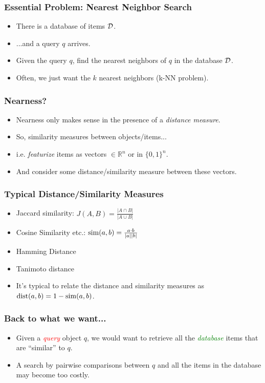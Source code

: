 \documentclass{beamer}
\begin{document}
\begin{frame}
\frametitle{Essential Problem: Nearest Neighbor Search}
\begin{itemize}
\item There is a database of items $\cal{D}$. 
\item ...and a query $q$ arrives. 
\pause
\item Given the query $q$, find the nearest neighbors of $q$ in the database $\cal{D}$. 
\pause
\item Often, we just want the $k$ nearest neighbors (k-NN problem).
\end{itemize}
\end{frame}

\begin{frame}
\frametitle{Nearness?}
\begin{itemize}
\item Nearness only makes sense in the presence of a {\em distance measure}.
\pause 
\item So, similarity measures between objects/items...
\item i.e. {\em featurize} items \pause as vectors $\in \mathbb{R}^n$ or in $\{0, 1\}^n$. 
\pause
\item And consider some distance/similarity measure between these vectors. 
\end{itemize}
\end{frame}

\begin{frame}
\frametitle{Typical Distance/Similarity Measures}
\begin{itemize}
\item Jaccard similarity: $J(A, B) = \frac{|A \cap B|}{|A \cup B|}$
\pause
\item Cosine Similarity etc.: $\mathrm{sim}(a, b) = \frac{a \cdot b}{|a||b|}$
\pause
\item Hamming Distance
\item Tanimoto distance
\pause
\item It's typical to relate the distance and similarity measures as $\mathrm{dist}(a, b) = 1 -\mathrm{sim}(a, b)$.
\end{itemize}
\end{frame}

\begin{frame}
\frametitle{Back to what we want...}
\begin{itemize}
\item Given a \textcolor{red}{\em query} object $q$, we would want to retrieve all the \textcolor{green}{\em database} items that are ``similar'' to $q$.
\pause
\item A search by pairwise comparisons between $q$ and all the items in the database may become too costly.
\end{itemize}
\end{frame}
\end{document}
